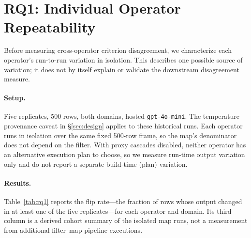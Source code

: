 \documentclass[11pt]{article}
\begin{document}
\section{RQ1: Individual Operator Repeatability}
\label{sec:rq1}

Before measuring cross-operator criterion disagreement, we characterize each
operator's run-to-run variation in isolation. This describes one possible
source of variation; it does not by itself explain or validate the downstream
disagreement measure.

\paragraph{Setup.}
Five replicates, 500 rows, both domains, hosted \texttt{gpt-4o-mini}. The
temperature provenance caveat in \S\ref{sec:design} applies to these
historical runs. Each operator runs in isolation over the same fixed 500-row
frame, so the map's denominator does not depend on the filter. With proxy
cascades disabled, neither operator has an alternative execution plan to
choose, so we measure run-time output variation only and do not report a
separate build-time (plan) variation.

\paragraph{Results.}
Table~\ref{tab:rq1} reports the flip rate---the fraction of rows whose
output changed in at least one of the five replicates---for each operator
and domain. Its third column is a derived cohort summary of the isolated
map runs, not a measurement from additional filter--map pipeline executions.

\begin{table}[t]
\centering
\caption{Individual operator flip rates (RQ1). Five replicates, 500 rows,
  hosted \texttt{gpt-4o-mini}. Wilson 95\% intervals.
  The third column restricts the isolated map outputs to rows admitted by
  every isolated filter replicate
  ($n_{\text{reviews}}=268$, $n_{\text{abstracts}}=154$). Wilson intervals
  are shown for all three columns.}
\label{tab:rq1}
\smallskip
{}
\end{table}
\end{document}
